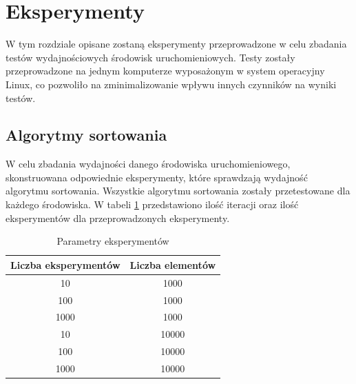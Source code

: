 \section{Eksperymenty}
W tym rozdziale opisane zostaną eksperymenty przeprowadzone w celu zbadania testów wydajnościowych środowisk uruchomieniowych. Testy zostały przeprowadzone na jednym komputerze wyposażonym w system operacyjny Linux, co pozwoliło na zminimalizowanie wpływu innych czynników na wyniki testów. 

\subsection{Algorytmy sortowania}
W celu zbadania wydajności danego środowiska uruchomieniowego, skonstruowana odpowiednie eksperymenty, które sprawdzają wydajność algorytmu sortowania. Wszystkie algorytmu sortowania zostały przetestowane dla każdego środowiska. W tabeli \ref{tab:sorting_experiments} przedstawiono ilość iteracji oraz ilość eksperymentów dla przeprowadzonych eksperymenty.

\begin{table}[H]
  \centering
  \begin{tabular}{|c|c|}
    \hline
    \textbf{Liczba eksperymentów} & \textbf{Liczba elementów} \\ \hline
    10 & 1000 \\ \hline
    100 & 1000 \\ \hline
    1000 & 1000 \\ \hline
    10 & 10000 \\ \hline
    100 & 10000 \\ \hline
    1000 & 10000 \\ \hline
  \end{tabular}
  \caption{Parametry eksperymentów}
  \label{tab:sorting_experiments}
\end{table}

